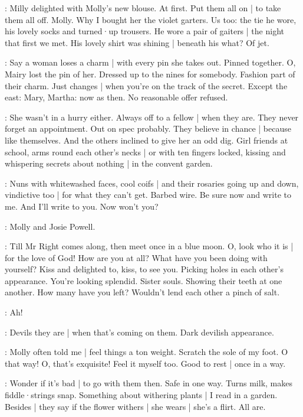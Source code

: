 \BloomHist:
Milly delighted with Molly's new blouse.
At first.
Put them all on |
to take them all off.
Molly.
Why I bought her the violet garters.%
Us too:
the tie he wore,
his lovely socks and turned·up trousers.
He wore a pair of gaiters |
the night that first we met.
His lovely shirt was shining |
beneath his what?
Of jet.

\BloomAbstract:
Say a woman loses a charm |
with every pin she takes out.
Pinned together.
O,
Mairy lost the pin of her.
Dressed up to the nines for somebody.
Fashion part of their charm.
Just changes |
when you're on the track of the secret.
Except the east:
Mary,
Martha:
now as then.
No reasonable offer refused.

\BloomCurrent:
She wasn't in a hurry either.
Always off to a fellow |
when they are.
They never forget an appointment.
Out on spec probably.
They believe in chance |
because like themselves.
And the others inclined to give her an odd dig.
Girl friends at school,
arms round each other's necks |%
or with ten fingers locked,
kissing and whispering secrets about nothing |
in the convent garden.

\BloomAbstract:
Nuns with whitewashed faces,
cool coifs |
and their rosaries
going up and down,
vindictive too |
for what they can't get.
Barbed wire.
Be sure now and write to me.
And I'll write to you.
Now won't you?

\BloomHist:
Molly and Josie Powell.

\BloomAbstract:
Till Mr Right comes along,
then meet once in a blue moon.
O,
look who it is |
for the love of God!
How are you at all?
What have you been doing with yourself?
Kiss and delighted to,
kiss,
to see you.
Picking holes in each other's appearance.
You're looking splendid.
Sister souls.
Showing their teeth at one another.
How many have you left?
Wouldn't lend each other
a pinch of salt.

\BloomInt:
Ah!

\BloomAbstract:
Devils they are |
when that's coming on them.
Dark devilish appearance.

\BloomHist:
Molly often told me |
feel things a ton weight.
Scratch the sole of my foot.
O that way!
O,
that's exquisite!
Feel it myself too.
Good to rest |
once in a way.

\BloomAbstract:
Wonder if it's bad |
to go with them then.
Safe in one way.
Turns milk,
makes fiddle·strings snap.
Something about withering plants |
I read in a garden.
Besides |
they say if the flower withers |
she wears |
she's a flirt.
All are.

